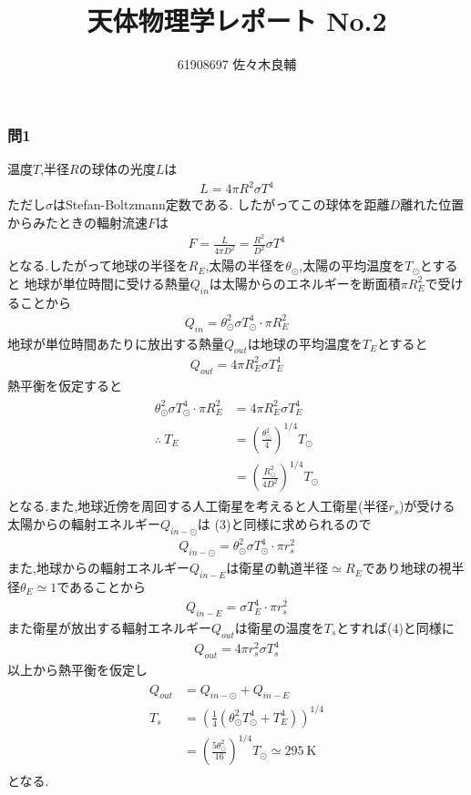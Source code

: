 \documentclass[uplatex,a4j,11pt,dvipdfmx]{jsarticle}
\begin{document}
\title{天体物理学レポート No.2}
\author{61908697 佐々木良輔}
\date{}
\maketitle
\subsubsection*{問1}
温度$T$,半径$R$の球体の光度$L$は
\begin{align}
  L=4\pi R^2\sigma T^4
\end{align}
ただし$\sigma$はStefan-Boltzmann定数である.
したがってこの球体を距離$D$離れた位置からみたときの輻射流速$F$は
\begin{align}
  F=\frac{L}{4\pi D^2}=\frac{R^2}{D^2}\sigma T^4
\end{align}
となる.したがって地球の半径を$R_E$,太陽の半径を$\theta_\odot$,太陽の平均温度を$T_\odot$とすると
地球が単位時間に受ける熱量$Q_{in}$は太陽からのエネルギーを断面積$\pi R_E^2$で受けることから
\begin{align}
  Q_{in}=\theta_\odot^2\sigma T_\odot^4\cdot \pi R_E^2
\end{align}
地球が単位時間あたりに放出する熱量$Q_{out}$は地球の平均温度を$T_E$とすると
\begin{align}
  Q_{out}=4\pi R_E^2\sigma T_E^4
\end{align}
熱平衡を仮定すると
\begin{align}
  \begin{split}
    \theta_\odot^2\sigma T_\odot^4\cdot \pi R_E^2&=4\pi R_E^2\sigma T_E^4\\
    \therefore\ T_E&=\left(\frac{\theta_\odot^2}{4}\right)^{1/4}T_\odot\\
    &=\left(\frac{R_\odot^2}{4D^2}\right)^{1/4}T_\odot
  \end{split}
\end{align}
となる.また,地球近傍を周回する人工衛星を考えると人工衛星(半径$r_s$)が受ける太陽からの輻射エネルギー$Q_{in-\odot}$は
(3)と同様に求められるので
\begin{align}
  Q_{in-\odot}=\theta_\odot^2\sigma T_\odot^4\cdot\pi r_s^2
\end{align}
また,地球からの輻射エネルギー$Q_{in-E}$は衛星の軌道半径$\simeq R_E$であり地球の視半径$\theta_E\simeq 1$であることから
\begin{align}
  Q_{in-E}=\sigma T_E^4\cdot\pi r_s^2
\end{align}
また衛星が放出する輻射エネルギー$Q_{out}$は衛星の温度を$T_s$とすれば(4)と同様に
\begin{align}
  Q_{out}=4\pi r_s^2\sigma T_s^4
\end{align}
以上から熱平衡を仮定し
\begin{align}
  \begin{split}
    Q_{out}&=Q_{in-\odot}+Q_{in-E}\\
    T_s&=\left(\frac{1}{4}(\theta_\odot^2 T_\odot^4+T_E^4)\right)^{1/4}\\
    &=\left(\frac{5\theta_\odot^2}{16}\right)^{1/4}T_\odot\simeq 295\ \si{\kelvin}
  \end{split}
\end{align}
となる.
\end{document}
